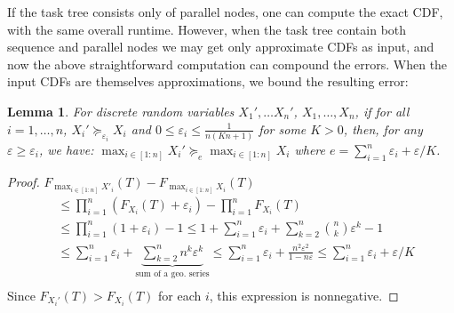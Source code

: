 \documentclass[review]{elsarticle}
\newtheorem{lemma}{Lemma}
\begin{document}
If the task tree consists only of parallel nodes, one can
compute the exact CDF, with the same overall runtime.
However, when the task tree contain both sequence and parallel nodes we may get
only approximate CDFs as input, and now the above straightforward computation can compound the errors.
When the input CDFs are themselves approximations, we bound the resulting error:

\begin{lemma} \label{appPalTheorem}
For discrete random variables  $X_1', \dots X_n'$, $X_1, \dots,X_n$, if for all $i=1,\dots,n$,  $X_i' \succeq_{\varepsilon_i} X_i$ and $0\leq\varepsilon_i\leq  \frac{1}{n (K n+1)}$ for some $K>0$,
then, for any $\varepsilon \geq \varepsilon_i$, we have: $\max_{i\in[1:n]}X_i' \succeq_{e} \max_{i\in[1:n]}X_i$ where $e=\sum_{i=1}^n \varepsilon_i + \varepsilon/K$.
\end{lemma}
\begin{proof}
$F_{\max_{i\in[1:n]}X'_i}
 (T) {-} F_{\max_{i\in[1:n]}X_i}
 (T)$
{
\begin{align*} 
&\leq \prod_{i=1}^n (F_{X_i}(T)+\varepsilon_i) {-} \prod_{i=1}^n F_{X_i}(T) \\
&\leq \prod_{i=1}^n (1+\varepsilon_i) - 1 
\leq 1+\sum_{i=1}^n \varepsilon_i + \sum_{k=2}^n {n \choose k}  \varepsilon^k - 1 \\
&\leq \sum_{i=1}^n \varepsilon_i + \!\!\!\!\underbrace{\sum_{k=2}^n n^k  \varepsilon^k}_{\text{sum of a geo. series}}\!\!\!\!
\leq \sum_{i=1}^n \varepsilon_i + \frac{n^2 \varepsilon^2}{1-n \varepsilon}
\leq \sum_{i=1}^n \varepsilon_i + \varepsilon/K\\
\end{align*}}%
Since $F_{X_i'}(T) > F_{X_i}(T)$ for each $i$, this expression is nonnegative.
\end{proof}
\end{document}
